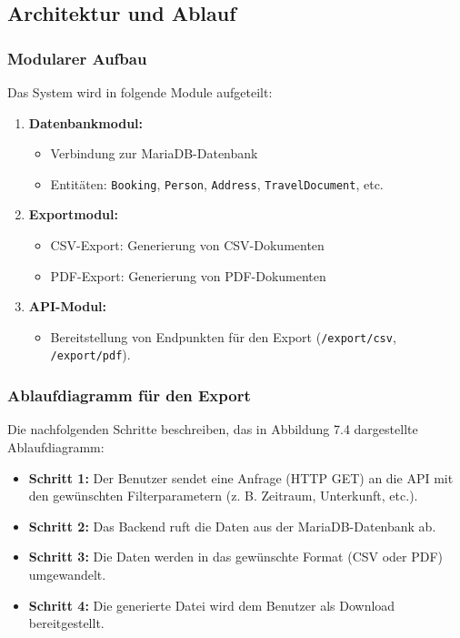 \subsection{Architektur und Ablauf}
\subsubsection{Modularer Aufbau}
Das System wird in folgende Module aufgeteilt:
\begin{enumerate}
	\item \textbf{Datenbankmodul:} 
	\begin{itemize}
		\item Verbindung zur MariaDB-Datenbank
		\item Entitäten: \texttt{Booking}, \texttt{Person}, \texttt{Address}, \texttt{TravelDocument}, etc.
	\end{itemize}
	
	\item \textbf{Exportmodul:}
	\begin{itemize}
		\item CSV-Export: Generierung von CSV-Dokumenten
		\item PDF-Export: Generierung von PDF-Dokumenten
	\end{itemize}
	
	\item \textbf{API-Modul:} 
	\begin{itemize}
		\item Bereitstellung von Endpunkten für den Export (\texttt{/export/csv}, \texttt{/export/pdf}).
	\end{itemize}
\end{enumerate}

\newpage
\subsubsection{Ablaufdiagramm für den Export}
Die nachfolgenden Schritte beschreiben, das in Abbildung 7.4 dargestellte Ablaufdiagramm:
\begin{itemize}
	\item \textbf{Schritt 1:} Der Benutzer sendet eine Anfrage (HTTP GET) an die API mit den gewünschten Filterparametern (z. B. Zeitraum, Unterkunft, etc.).
	\item \textbf{Schritt 2:} Das Backend ruft die Daten aus der MariaDB-Datenbank ab.
	\item \textbf{Schritt 3:} Die Daten werden in das gewünschte Format (CSV oder PDF) umgewandelt.
	\item \textbf{Schritt 4:} Die generierte Datei wird dem Benutzer als Download bereitgestellt.
\end{itemize}

